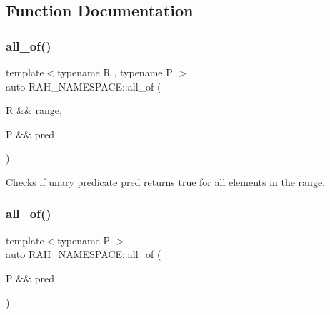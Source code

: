 \subsection{Function Documentation}
\mbox{\label{namespace_r_a_h___n_a_m_e_s_p_a_c_e_aec4c662eceec62042b028b7174ae6106}} 
\subsubsection{\texorpdfstring{all\_of()}{all\_of()}\hspace{0.1cm}{\footnotesize\ttfamily [1/2]}}
{\footnotesize\ttfamily template$<$typename R , typename P $>$ \\
auto R\+A\+H\+\_\+\+N\+A\+M\+E\+S\+P\+A\+C\+E\+::all\+\_\+of (\begin{DoxyParamCaption}\item[{R \&\&}]{range,  }\item[{P \&\&}]{pred }\end{DoxyParamCaption})}



Checks if unary predicate pred returns true for all elements in the range. 


\begin{DoxyCodeInclude}{0}
\DoxyCodeLine{    );}
\end{DoxyCodeInclude}
\mbox{\label{namespace_r_a_h___n_a_m_e_s_p_a_c_e_a227fbd8db9d61d38ce1f5511d3851250}} 
\subsubsection{\texorpdfstring{all\_of()}{all\_of()}\hspace{0.1cm}{\footnotesize\ttfamily [2/2]}}
{\footnotesize\ttfamily template$<$typename P $>$ \\
auto R\+A\+H\+\_\+\+N\+A\+M\+E\+S\+P\+A\+C\+E\+::all\+\_\+of (\begin{DoxyParamCaption}\item[{P \&\&}]{pred }\end{DoxyParamCaption})}



